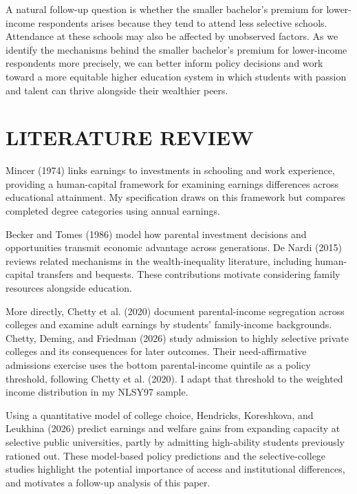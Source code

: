 \documentclass[12pt,letterpaper]{article}
\begin{document}
A natural follow-up question is whether the smaller bachelor's premium for lower-income
respondents arises because they tend to attend less selective schools. Attendance at these
schools may also be affected by unobserved factors. As we identify the mechanisms behind the
smaller bachelor's premium for lower-income respondents more precisely, we can better inform
policy decisions and work toward a more equitable higher education system in which students
with passion and talent can thrive alongside their wealthier peers.

\section*{LITERATURE REVIEW}

Mincer (1974) links earnings to investments in schooling and work experience,
providing a human-capital framework for examining earnings differences across
educational attainment. My specification draws on this framework but compares
completed degree categories using annual earnings. \newline

Becker and Tomes (1986) model how parental investment decisions and opportunities
transmit economic advantage across generations. De Nardi (2015) reviews related
mechanisms in the wealth-inequality literature, including human-capital transfers
and bequests. These contributions motivate considering family resources alongside
education. \newline

More directly, Chetty et al. (2020) document parental-income segregation across
colleges and examine adult earnings by students' family-income backgrounds.
Chetty, Deming, and Friedman (2026) study admission to highly selective private
colleges and its consequences for later outcomes. Their need-affirmative admissions
exercise uses the bottom parental-income quintile as a policy threshold, following
Chetty et al. (2020). I adapt that threshold to the weighted income distribution in
my NLSY97 sample. \newline

Using a quantitative model of college choice, Hendricks, Koreshkova, and Leukhina
(2026) predict earnings and welfare gains from expanding capacity at selective
public universities, partly by admitting high-ability students previously rationed
out. These model-based policy predictions and the selective-college studies
highlight the potential importance of access and institutional differences, 
and motivates a follow-up analysis of this paper.\newline
\end{document}
